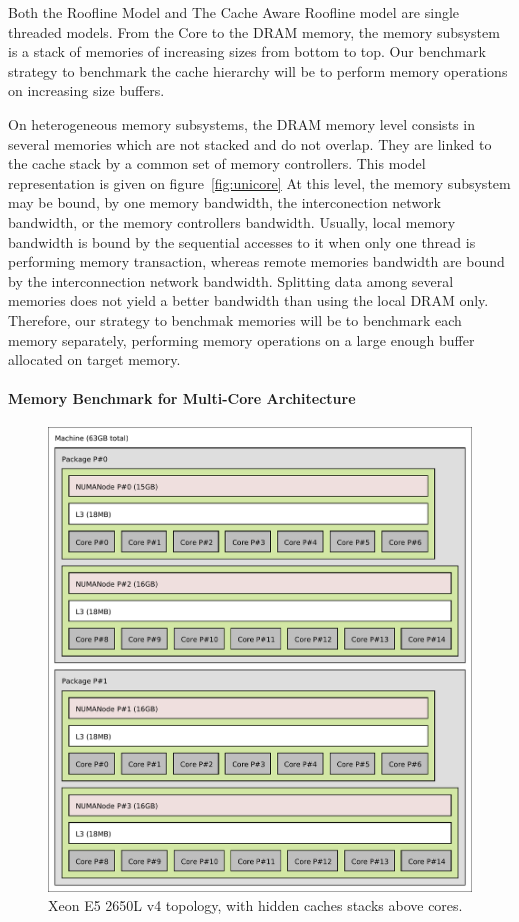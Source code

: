 \documentclass[twoside,twocolumn,8pt]{extarticle}
\begin{document}
Both the Roofline Model and The Cache Aware Roofline model are single threaded models.
From the Core to the DRAM memory, the memory subsystem is a stack of memories of increasing sizes from bottom to top.
Our benchmark strategy to benchmark the cache hierarchy will be to perform memory operations on increasing size buffers.

On heterogeneous memory subsystems, the DRAM memory level consists in several memories which are not stacked and do not
overlap. They are linked to the cache stack by a common set of memory controllers. This model representation is given on
figure~\ref{fig:unicore}
At this level, the memory subsystem may be bound, by one memory bandwidth, the interconection network bandwidth,
or the memory controllers bandwidth.
Usually, local memory bandwidth is bound by the sequential accesses to it when only one thread is performing memory transaction,
whereas remote memories bandwidth are bound by the interconnection network bandwidth.
Splitting data among several memories does not yield a better bandwidth than using the local DRAM only.
Therefore, our strategy to benchmak memories will be to benchmark each memory separately, performing memory operations on a large
enough buffer allocated on target memory.

\paragraph{Memory Benchmark for Multi-Core Architecture}

\begin{figure}
  \centering
  \includegraphics[width=.5\textwidth]{pictures/Xeon_E5_2650L_v4}
  \caption{Xeon E5 2650L v4 topology, with hidden caches stacks above cores.}
  \label{fig:joe0}
\end{figure}
\end{document}
